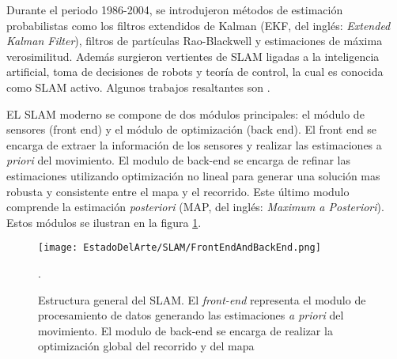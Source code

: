 Durante el periodo 1986-2004, se introdujeron métodos de estimación probabilistas  como los filtros extendidos de Kalman (EKF, del inglés: \textit{Extended Kalman Filter}), filtros de partículas Rao-Blackwell y estimaciones de máxima verosimilitud. Además surgieron vertientes de SLAM ligadas a la inteligencia artificial, toma de decisiones de robots y teoría de control, la cual es conocida como SLAM activo. Algunos trabajos resaltantes son \cite{Feder, Smith, Makarenko, Stachniss}.

EL SLAM moderno se compone de dos módulos principales: el módulo de sensores (front end) y el módulo de optimización (back end). El front end se encarga de extraer la información de los sensores y realizar las estimaciones a \textit{priori} del movimiento. El modulo de back-end se encarga de refinar las estimaciones utilizando optimización no lineal para generar una solución mas robusta y consistente entre el mapa y el recorrido. Este último modulo comprende la estimación \textit{posteriori} (MAP, del inglés: \textit{Maximum a Posteriori}). Estos módulos se ilustran en la figura \ref{fig:SLAMStruct}.

\begin{figure}[H]
	\centering
	\texttt{[image: EstadoDelArte/SLAM/FrontEndAndBackEnd.png]}
	\caption{Estructura general del SLAM. El \textit{front-end} representa el modulo de procesamiento de datos generando las estimaciones \textit{a priori} del movimiento. El modulo de back-end se encarga de realizar la optimización global del recorrido y del mapa \cite{Cadena}}.
	\label{fig:SLAMStruct}
\end{figure}



